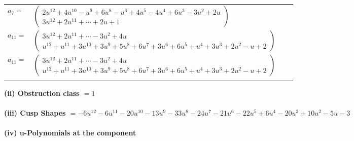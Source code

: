 \documentclass[1p]{elsarticle_modified}
\theoremstyle{definition}
\begin{document}
\begin{tabular}{m{7pt} m{180pt} m{7pt} m{180pt} }
\flushright $a_{7}=$&$\begin{pmatrix}2 u^{12}+4 u^{10}- u^9+6 u^8- u^6+4 u^5-4 u^4+6 u^3-3 u^2+2 u\\3 u^{12}+2 u^{11}+\cdots+2 u+1\end{pmatrix}$ \\
\flushright $a_{11}=$&$\begin{pmatrix}3 u^{12}+2 u^{11}+\cdots-3 u^2+4 u\\u^{12}+u^{11}+3 u^{10}+3 u^9+5 u^8+6 u^7+3 u^6+6 u^5+u^4+3 u^3+2 u^2- u+2\end{pmatrix}$\\ \flushright $a_{11}=$&$\begin{pmatrix}3 u^{12}+2 u^{11}+\cdots-3 u^2+4 u\\u^{12}+u^{11}+3 u^{10}+3 u^9+5 u^8+6 u^7+3 u^6+6 u^5+u^4+3 u^3+2 u^2- u+2\end{pmatrix}$\\&\end{tabular}
\flushleft \textbf{(ii) Obstruction class $= 1$}\\~\\
\flushleft \textbf{(iii) Cusp Shapes $= -6 u^{12}-6 u^{11}-20 u^{10}-13 u^9-33 u^8-24 u^7-21 u^6-22 u^5+6 u^4-20 u^3+10 u^2-5 u-3$}\\~\\
\newpage\renewcommand{\arraystretch}{1}
\flushleft \textbf{(iv) u-Polynomials at the component}\newline \\
\end{document}
